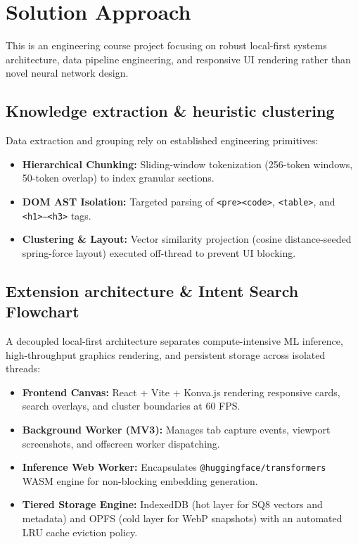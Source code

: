 \documentclass[11pt,a4paper]{article}
\begin{document}
\section{Solution Approach}
This is an engineering course project focusing on robust local-first systems architecture, data pipeline engineering, and responsive UI rendering rather than novel neural network design.

\subsection{Knowledge extraction \& heuristic clustering}
Data extraction and grouping rely on established engineering primitives:
\begin{itemize}[leftmargin=0.7cm]
    \item \textbf{Hierarchical Chunking:} Sliding-window tokenization (256-token windows, 50-token overlap) to index granular sections.
    \item \textbf{DOM AST Isolation:} Targeted parsing of \texttt{<pre><code>}, \texttt{<table>}, and \texttt{<h1>--<h3>} tags.
    \item \textbf{Clustering \& Layout:} Vector similarity projection (cosine distance-seeded spring-force layout) executed off-thread to prevent UI blocking.
\end{itemize}

\subsection{Extension architecture \& Intent Search Flowchart}
A decoupled local-first architecture separates compute-intensive ML inference, high-throughput graphics rendering, and persistent storage across isolated threads:
\begin{itemize}[leftmargin=0.7cm]
    \item \textbf{Frontend Canvas:} React + Vite + Konva.js rendering responsive cards, search overlays, and cluster boundaries at 60 FPS.
    \item \textbf{Background Worker (MV3):} Manages tab capture events, viewport screenshots, and offscreen worker dispatching.
    \item \textbf{Inference Web Worker:} Encapsulates \texttt{@huggingface/transformers} WASM engine for non-blocking embedding generation.
    \item \textbf{Tiered Storage Engine:} IndexedDB (hot layer for SQ8 vectors and metadata) and OPFS (cold layer for WebP snapshots) with an automated LRU cache eviction policy.
\end{itemize}
\end{document}
